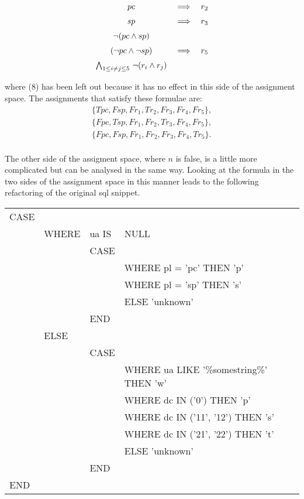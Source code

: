 \documentclass[../MathsNotesBase.tex]{subfiles}
\begin{document}
{\begin{exe}
			\[ 
			\begin{array}{ccc}
				pc & \implies & r_2  \nn
				sp & \implies & r_3  \nn
				\lnot(pc \land sp) && \nn
				(\lnot pc \land \lnot sp) & \implies & r_5 \nn
				\bigwedge_{1 \leq i \neq j \leq 5} \, \lnot(r_i \land r_j) \nn
			\end{array}
			\]
			where (8) has been left out because it has no effect in this side of the assignment space. The assignments that satisfy these formulae are:
			\[\begin{aligned}
				\{ Tpc, Fsp, Fr_1, Tr_2, Fr_3, Fr_4, Fr_5 \}, \\
				\{ Fpc, Tsp, Fr_1, Fr_2, Tr_3, Fr_4, Fr_5 \}, \\
				\{ Fpc, Fsp, Fr_1, Fr_2, Fr_3, Fr_4, Tr_5 \}. \\
			\end{aligned}\]
			
			The other side of the assigment space, where $n$ is false, is a little more complicated but can be analysed in the same way. Looking at the formula in the two sides of the assignment space in this manner leads to the following refactoring of the original sql snippet.
			\nl
			\begin{tabular}[h!]{*5l}
				CASE&& \\
					&WHERE &ua IS& NULL \\
						  &&CASE& \\
						  	&&&WHERE pl = 'pc' THEN 'p' \\
						  	&&&WHERE pl = 'sp' THEN 's' \\
						  	&&&ELSE 'unknown' \\
						  &&END& \\
					&ELSE& \\
						  &&CASE& \\
						  	&&&WHERE ua LIKE '\%somestring\%' THEN 'w' \\
						  	&&&WHERE dc IN ('0') THEN 'p' \\
						  	&&&WHERE dc IN ('11', '12') THEN 's' \\
						  	&&&WHERE dc IN ('21', '22') THEN 't' \\
						  	&&&ELSE 'unknown' \\
						  &&END& \\
				END&& \\
			\end{tabular}\\
		

			
			\nl[12]
			\ex {}
		\end{exe}
	
}
\end{document}

